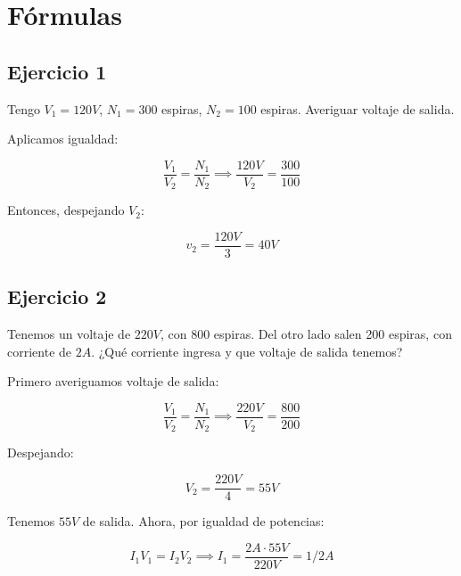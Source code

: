 \section{Fórmulas}

\subsection{Ejercicio 1}

Tengo \(V_1 = 120 V\), \(N_1 = 300\) espiras, \(N_2 = 100\) espiras.
Averiguar voltaje de salida.

Aplicamos igualdad:

\begin{equation*}
    \frac{V_1}{V_2} = \frac{N_1}{N_2} \implies \frac{120 V}{V_2} = \frac{300}{100}
\end{equation*}

Entonces, despejando \(V_2\):

\begin{equation*}
    v_2 = \frac{120 V}{3} = \boxed{40 V}
\end{equation*}

\subsection{Ejercicio 2}

Tenemos un voltaje de \(220V\),
con 800 espiras.
Del otro lado salen 200 espiras, con corriente de \(2 A\).
¿Qué corriente ingresa y que voltaje de salida tenemos?

Primero averiguamos voltaje de salida:

\begin{equation*}
    \frac{V_1}{V_2} = \frac{N_1}{N_2} \implies \frac{220V}{V_2} = \frac{800}{200}
\end{equation*}

Despejando:

\begin{equation*}
    V_2 = \frac{220V}{4} = \boxed{55V}
\end{equation*}

Tenemos \(55V\) de salida. Ahora, por igualdad de potencias:

\begin{equation*}
    I_1V_1 = I_2V_2 \implies I_1 = \frac{2 A\cdot55V}{220V} = \boxed{1/2 A}
\end{equation*}
